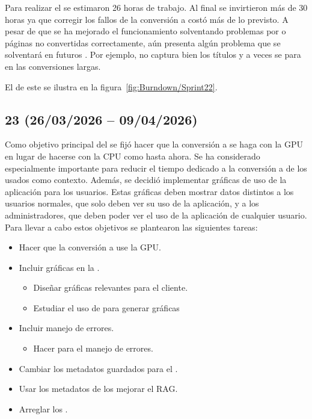 Para realizar el  se estimaron 26 horas de trabajo. Al final se invirtieron más de 30 horas ya que corregir los fallos de la conversión a  costó más de lo previsto. A pesar de que se ha mejorado el funcionamiento solventando problemas por  o páginas no convertidas correctamente, aún presenta algún problema que se solventará en futuros . Por ejemplo, no captura bien los títulos y a veces se para en las conversiones largas.

El  de este  se ilustra en la figura~\ref{fig:Burndown/Sprint22}.


\subsection{ 23 (26/03/2026 -- 09/04/2026)}
Como objetivo principal del  se fijó hacer que la conversión a  se haga con la GPU en lugar de hacerse con la CPU como hasta ahora. Se ha considerado especialmente importante para reducir el tiempo dedicado a la conversión a  de los  usados como contexto. Además, se decidió implementar gráficas de uso de la aplicación para los usuarios. Estas gráficas deben mostrar datos distintos a los usuarios normales, que solo deben ver su uso de la aplicación, y a los administradores, que deben poder ver el uso de la aplicación de cualquier usuario.  Para llevar a cabo estos objetivos se plantearon las siguientes tareas:

\begin{itemize}
	\tightlist
	\item Hacer que la conversión a  use la GPU.
	\item Incluir gráficas en la .
	\begin{itemize}
	\tightlist
		\item Diseñar gráficas relevantes para el cliente.
		\item Estudiar el uso de  para generar gráficas
	\end{itemize}
	\item Incluir manejo de errores.
	\begin{itemize}
	\tightlist
		\item Hacer  para el manejo de errores.
	\end{itemize}
	\item Cambiar los metadatos guardados para el .
	\item Usar los metadatos de los  mejorar el RAG.
	\item Arreglar los .
\end{itemize}

